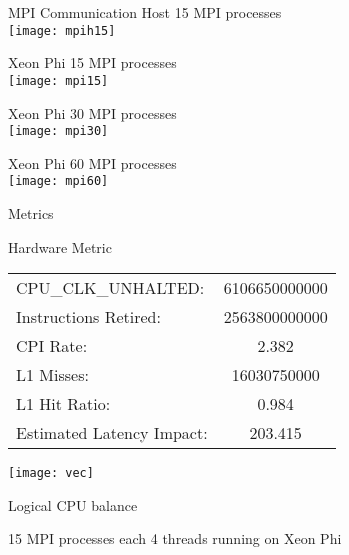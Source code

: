 \begin{frame}[fragile]{MPI Communication}
Host 15 MPI processes \\
\texttt{[image: mpih15]}

Xeon Phi 15 MPI processes \\
\texttt{[image: mpi15]}

Xeon Phi 30 MPI processes \\
\texttt{[image: mpi30]}

Xeon Phi 60 MPI processes \\
\texttt{[image: mpi60]}
\end{frame}
\begin{frame}[fragile]{Metrics}
\par{Hardware Metric}
\begin{tabular}{lc}
\hline
   CPU\_CLK\_UNHALTED: & 6106650000000\\  
   Instructions Retired: & 2563800000000\\
   CPI Rate:& 2.382\\
   L1 Misses:&  16030750000\\ 
   L1 Hit Ratio: & 0.984\\
    Estimated Latency Impact:& 203.415\\
\end{tabular}

\texttt{[image: vec]}

\end{frame}
\begin{frame}[fragile]{Logical CPU balance}
\vspace{20mm}
\begin{figure}
\end{figure}
\vspace{20mm}
\par{15 MPI processes each 4 threads running on Xeon Phi}
\end{frame}

